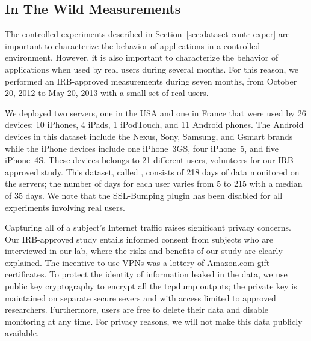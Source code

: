 
\subsection{In The Wild Measurements}
\label{sec:dataset-wild-measurements}

The controlled experiments described in
Section~\ref{sec:dataset-contr-exper} are important to characterize
the behavior of applications in a controlled environment. However, it
is also important to characterize the behavior of applications when
used by real users during several months. For this reason, we
performed an IRB-approved measurements during seven months, from 
October 20, 2012 to May 20, 2013 with a small set of real users.

We deployed two \platname servers, one in the USA and one in France
that were used by 26 devices: 10 iPhones, 4 iPads, 1 iPodTouch, and 11
Android phones.  The Android devices in this dataset include the
Nexus, Sony, Samsung, and Gsmart brands while the iPhone devices
include one iPhone~3GS, four iPhone~5, and five iPhone~4S.  These
devices belongs to 21 different users, volunteers for our IRB approved
study.  This dataset, called \mobWild, consists of 218 days of data
monitored on the \platname{} servers; the number of days for each user
varies from 5 to 215 with a median of 35 days.  We note that the
SSL-Bumping plugin has been disabled for all experiments involving
real users.

Capturing all of a subject's Internet traffic raises significant
privacy concerns.  Our IRB-approved study entails informed consent
from subjects who are interviewed in our lab, where the risks and
benefits of our study are clearly explained.  The incentive to use
VPNs was a lottery of Amazon.com gift certificates. To protect the
identity of information leaked in the data, we use public key
cryptography to encrypt all the tcpdump outputs; the private key is
maintained on separate secure severs and with access limited to
approved researchers.  Furthermore, users are free to delete their
data and disable monitoring at any time.  For privacy reasons, we will
not make this data publicly available.



